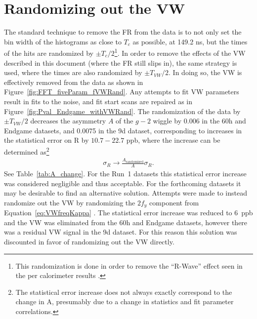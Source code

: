 \documentclass[12pt,letterpaper]{article}
\newcommand{\figref}[1]{Figure~\ref{#1}}
\def\gmtwo{$g-2$\xspace}
\begin{document}
\clearpage

\section{Randomizing out the VW}
\label{sec:randomization}


The standard technique to remove the FR from the data is to not only set the bin width of the histograms as close to $T_{c}$ as possible, at 149.2 ns, but the times of the hits are randomized by $\pm T_{c}/2$\footnote{This randomization is done in order to remove the ``R-Wave'' effect seen in the per calorimeter results \cite{Rwave}.}. In order to remove the effects of the VW described in this document (where the FR still slips in), the same strategy is used, where the times are also randomized by $\pm T_{VW}/2$. In doing so, the VW is effectively removed from the data as shown in \figref{fig:FFT_fiveParam_fVWRand}. Any attempts to fit VW parameters result in fits to the noise, and fit start scans are repaired as in \figref{fig:Pval_Endgame_withVWRand}. The randomization of the data by $\pm T_{VW}/2$ decreases the asymmetry $A$ of the \gmtwo wiggle by 0.006 in the 60h and Endgame datasets, and 0.0075 in the 9d dataset, corresponding to increases in the statistical error on R by $10.7 - 22.7$ ppb, where the increase can be determined as\footnote{The statistical error increase does not always exactly correspond to the change in A, presumably due to a change in statistics and fit parameter correlations.}
    \begin{align}
        \sigma_{R} \rightarrow \frac{ A_{\text{randomized}}}{A}\sigma_{R}.
    \end{align}
See Table~\ref{tab:A_change}. For the Run~1 datasets this statistical error increase was considered negligible and thus acceptable. For the forthcoming datasets it may be desirable to find an alternative solution. Attempts were made to instead randomize out the VW by randomizing the $2f_{y}$ component from Equation~\ref{eq:VWfreqKappa} \cite{wa_presentation}. The statistical error increase was reduced to 6~ppb and the VW was eliminated from the 60h and Endgame datasets, however there was a residual VW signal in the 9d dataset. For this reason this solution was discounted in favor of randomizing out the VW directly.
\end{document}
